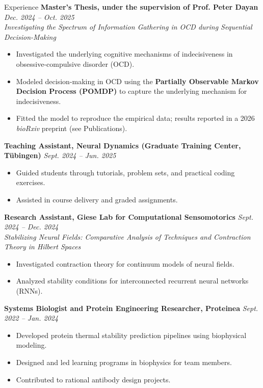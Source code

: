\documentclass{resume} %
\begin{document}
\begin{rSection}{Experience}
\textbf{Master's Thesis, under the supervision of Prof. Peter Dayan} \hfill \textit{Dec. 2024 -- Oct. 2025} \\
\textit{Investigating the Spectrum of Information Gathering in OCD during Sequential Decision-Making}
\begin{itemize}
    \item Investigated the underlying cognitive mechanisms of indecisiveness in obsessive-compulsive disorder (OCD).
    \item Modeled decision-making in OCD using the \textbf{Partially Observable Markov Decision Process (POMDP)} to capture the underlying mechanism for indecisiveness.
    \item Fitted the model to reproduce the empirical data; results reported in a 2026 \textit{bioRxiv} preprint (see Publications).
\end{itemize}


\textbf{Teaching Assistant, Neural Dynamics (Graduate Training Center, Tübingen)} \hfill \textit{Sept. 2024 -- Jun. 2025}
\begin{itemize}
    \item Guided students through tutorials, problem sets, and practical coding exercises.
    \item Assisted in course delivery and graded assignments.
\end{itemize}

\textbf{Research Assistant, Giese Lab for Computational Sensomotorics} \hfill \textit{Sept. 2024 -- Dec. 2024} \\
\textit{Stabilizing Neural Fields: Comparative Analysis of Techniques and Contraction Theory in Hilbert Spaces}
\begin{itemize}
    \item Investigated contraction theory for continuum models of neural fields.
    \item Analyzed stability conditions for interconnected recurrent neural networks (RNNs).
\end{itemize}

\textbf{Systems Biologist and Protein Engineering Researcher, Proteinea} \hfill \textit{Sept. 2022 -- Jan. 2024}
\begin{itemize}
    \item Developed protein thermal stability prediction pipelines using biophysical modeling.
    \item Designed and led learning programs in biophysics for team members.
    \item Contributed to rational antibody design projects.
\end{itemize}


\end{rSection}
\end{document}
